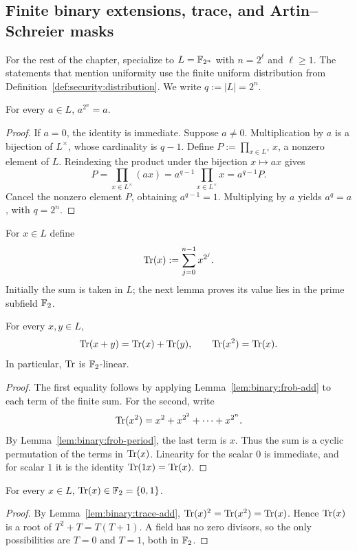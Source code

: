 \subsection{Finite binary extensions, trace, and Artin--Schreier masks}\label{sec:binary:trace}

For the rest of the chapter, specialize to
$L=\mathbb{F}_{2^n}$ with $n=2^\ell$ and $\ell\geq1$.
The statements that mention uniformity use the finite uniform
distribution from Definition~\ref{def:security:distribution}.
We write $q:=|L|=2^n$.

\begin{lemma}\label{lem:binary:frob-period}
For every $a\in L$, $a^{2^n}=a$.
\end{lemma}
\begin{proof}
If $a=0$, the identity is immediate. Suppose $a\neq0$.
Multiplication by $a$ is a bijection of $L^\times$,
whose cardinality is $q-1$. Define
$P:=\prod_{x\in L^\times}x$, a nonzero element of $L$.
Reindexing the product under the bijection $x\mapsto ax$ gives
\[
 P=\prod_{x\in L^\times}(ax)
  =a^{q-1}\prod_{x\in L^\times}x=a^{q-1}P.
\]
Cancel the nonzero element $P$, obtaining $a^{q-1}=1$.
Multiplying by $a$ yields $a^q=a$, with $q=2^n$.
\end{proof}

\begin{definition}\label{def:binary:trace}
For $x\in L$ define
\[
 \operatorname{Tr}(x):=\sum_{j=0}^{n-1}x^{2^j}.
\]
Initially the sum is taken in $L$; the next lemma proves its
value lies in the prime subfield $\mathbb{F}_2$.
\end{definition}

\begin{lemma}\label{lem:binary:trace-add}
For every $x,y\in L$,
\[
 \operatorname{Tr}(x+y)=\operatorname{Tr}(x)+\operatorname{Tr}(y),\qquad
 \operatorname{Tr}(x^2)=\operatorname{Tr}(x).
\]
In particular, $\operatorname{Tr}$ is $\mathbb{F}_2$-linear.
\end{lemma}
\begin{proof}
The first equality follows by applying
Lemma~\ref{lem:binary:frob-add} to each term of the finite sum.
For the second, write
\[
 \operatorname{Tr}(x^2)=x^2+x^{2^2}+\cdots+x^{2^n}.
\]
By Lemma~\ref{lem:binary:frob-period}, the last term is $x$.
Thus the sum is a cyclic permutation of the terms in $\operatorname{Tr}(x)$.
Linearity for the scalar $0$ is immediate, and for scalar $1$
it is the identity $\operatorname{Tr}(1x)=\operatorname{Tr}(x)$.
\end{proof}

\begin{lemma}\label{lem:binary:trace-binary}
For every $x\in L$, $\operatorname{Tr}(x)\in\mathbb{F}_2=\{0,1\}$.
\end{lemma}
\begin{proof}
By Lemma~\ref{lem:binary:trace-add},
$\operatorname{Tr}(x)^2=\operatorname{Tr}(x^2)=\operatorname{Tr}(x)$.
Hence $\operatorname{Tr}(x)$ is a root of $T^2+T=T(T+1)$.
A field has no zero divisors, so the only possibilities are
$T=0$ and $T=1$, both in $\mathbb{F}_2$.
\end{proof}

